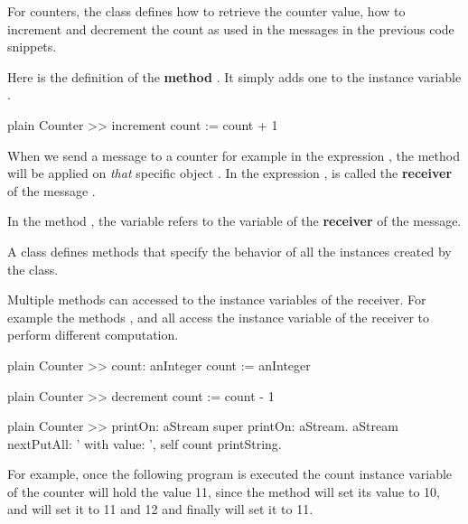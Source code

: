 \documentclass[10pt,twoside,english]{_support/latex/sbabook/sbabook}
\begin{document}
For counters, the class defines how to retrieve the counter value, how to increment 
and decrement the count as used in the messages in the previous code snippets.

Here is the definition of the \textbf{method} . 
It simply adds one to the instance variable .

\begin{displaycode}{plain}
Counter >> increment
	count := count + 1
\end{displaycode}

When we send a message to a counter for example in the expression , 
the method  will be applied on \textit{that} specific object .
In the expression ,  is called the \textbf{receiver} of the message . 

In the method ,  the variable  refers to the variable of the \textbf{receiver} of the message. 

\begin{coffee}
A class defines methods that specify the behavior of all the instances created by the class.
\end{coffee}

Multiple methods can accessed to the instance variables of the receiver. For example the methods ,   and  all access the instance variable  of the receiver to perform different computation. 

\begin{displaycode}{plain}
Counter >> count: anInteger
	count := anInteger
\end{displaycode}

\begin{displaycode}{plain}
Counter >> decrement
	count := count - 1
\end{displaycode}

\begin{displaycode}{plain}
Counter >> printOn: aStream
   super printOn: aStream.
   aStream nextPutAll: ' with value: ', self count printString.
\end{displaycode}

For example, once the following program is executed the count  instance variable of the counter  will hold the value 11, since the method  will set its value to 10, and  will set it to 11 and 12 and finally  will set it to 11. 
\end{document}

